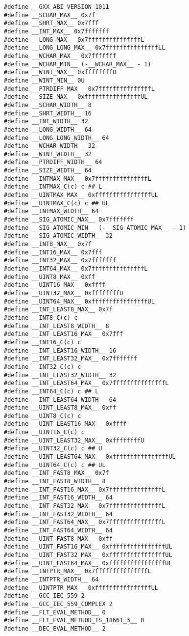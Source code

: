 \documentclass[11pt]{article}
\begin{document}
\begin{verbatim}
#define __GXX_ABI_VERSION 1011
#define __SCHAR_MAX__ 0x7f
#define __SHRT_MAX__ 0x7fff
#define __INT_MAX__ 0x7fffffff
#define __LONG_MAX__ 0x7fffffffffffffffL
#define __LONG_LONG_MAX__ 0x7fffffffffffffffLL
#define __WCHAR_MAX__ 0x7fffffff
#define __WCHAR_MIN__ (-__WCHAR_MAX__ - 1)
#define __WINT_MAX__ 0xffffffffU
#define __WINT_MIN__ 0U
#define __PTRDIFF_MAX__ 0x7fffffffffffffffL
#define __SIZE_MAX__ 0xffffffffffffffffUL
#define __SCHAR_WIDTH__ 8
#define __SHRT_WIDTH__ 16
#define __INT_WIDTH__ 32
#define __LONG_WIDTH__ 64
#define __LONG_LONG_WIDTH__ 64
#define __WCHAR_WIDTH__ 32
#define __WINT_WIDTH__ 32
#define __PTRDIFF_WIDTH__ 64
#define __SIZE_WIDTH__ 64
#define __INTMAX_MAX__ 0x7fffffffffffffffL
#define __INTMAX_C(c) c ## L
#define __UINTMAX_MAX__ 0xffffffffffffffffUL
#define __UINTMAX_C(c) c ## UL
#define __INTMAX_WIDTH__ 64
#define __SIG_ATOMIC_MAX__ 0x7fffffff
#define __SIG_ATOMIC_MIN__ (-__SIG_ATOMIC_MAX__ - 1)
#define __SIG_ATOMIC_WIDTH__ 32
#define __INT8_MAX__ 0x7f
#define __INT16_MAX__ 0x7fff
#define __INT32_MAX__ 0x7fffffff
#define __INT64_MAX__ 0x7fffffffffffffffL
#define __UINT8_MAX__ 0xff
#define __UINT16_MAX__ 0xffff
#define __UINT32_MAX__ 0xffffffffU
#define __UINT64_MAX__ 0xffffffffffffffffUL
#define __INT_LEAST8_MAX__ 0x7f
#define __INT8_C(c) c
#define __INT_LEAST8_WIDTH__ 8
#define __INT_LEAST16_MAX__ 0x7fff
#define __INT16_C(c) c
#define __INT_LEAST16_WIDTH__ 16
#define __INT_LEAST32_MAX__ 0x7fffffff
#define __INT32_C(c) c
#define __INT_LEAST32_WIDTH__ 32
#define __INT_LEAST64_MAX__ 0x7fffffffffffffffL
#define __INT64_C(c) c ## L
#define __INT_LEAST64_WIDTH__ 64
#define __UINT_LEAST8_MAX__ 0xff
#define __UINT8_C(c) c
#define __UINT_LEAST16_MAX__ 0xffff
#define __UINT16_C(c) c
#define __UINT_LEAST32_MAX__ 0xffffffffU
#define __UINT32_C(c) c ## U
#define __UINT_LEAST64_MAX__ 0xffffffffffffffffUL
#define __UINT64_C(c) c ## UL
#define __INT_FAST8_MAX__ 0x7f
#define __INT_FAST8_WIDTH__ 8
#define __INT_FAST16_MAX__ 0x7fffffffffffffffL
#define __INT_FAST16_WIDTH__ 64
#define __INT_FAST32_MAX__ 0x7fffffffffffffffL
#define __INT_FAST32_WIDTH__ 64
#define __INT_FAST64_MAX__ 0x7fffffffffffffffL
#define __INT_FAST64_WIDTH__ 64
#define __UINT_FAST8_MAX__ 0xff
#define __UINT_FAST16_MAX__ 0xffffffffffffffffUL
#define __UINT_FAST32_MAX__ 0xffffffffffffffffUL
#define __UINT_FAST64_MAX__ 0xffffffffffffffffUL
#define __INTPTR_MAX__ 0x7fffffffffffffffL
#define __INTPTR_WIDTH__ 64
#define __UINTPTR_MAX__ 0xffffffffffffffffUL
#define __GCC_IEC_559 2
#define __GCC_IEC_559_COMPLEX 2
#define __FLT_EVAL_METHOD__ 0
#define __FLT_EVAL_METHOD_TS_18661_3__ 0
#define __DEC_EVAL_METHOD__ 2

\end{verbatim}
\end{document}
